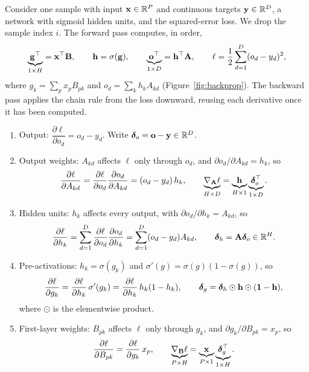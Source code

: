 Consider one sample with input $\mathbf{x}\in\mathbb{R}^P$ and continuous targets $\mathbf{y}\in\mathbb{R}^D$, a network with sigmoid hidden units, and the squared-error loss. We drop the sample index $i$. The forward pass computes, in order,
\begin{equation}
  \underbrace{\mathbf{g}^\top}_{1\times H} = \mathbf{x}^\top\mathbf{B}, \qquad \mathbf{h} = \sigma(\mathbf{g}), \qquad \underbrace{\mathbf{o}^\top}_{1\times D} = \mathbf{h}^\top\mathbf{A}, \qquad \ell = \frac12\sum_{d=1}^D(o_d-y_d)^2,
\end{equation}
where $g_k=\sum_p x_pB_{pk}$ and $o_d=\sum_k h_kA_{kd}$ (Figure~\ref{fig:backprop}). The backward pass applies the chain rule from the loss downward, reusing each derivative once it has been computed.
\begin{enumerate}
  \item Output: $\dfrac{\partial\ell}{\partial o_d} = o_d - y_d$. Write $\boldsymbol{\delta}_{o}=\mathbf{o}-\mathbf{y}\in\mathbb{R}^D$.
  \item Output weights: $A_{kd}$ affects $\ell$ only through $o_d$, and $\partial o_d/\partial A_{kd}=h_k$, so
  \begin{equation}
    \frac{\partial\ell}{\partial A_{kd}} = \frac{\partial\ell}{\partial o_d}\frac{\partial o_d}{\partial A_{kd}} = (o_d-y_d)\,h_k, \qquad \underbrace{\nabla_{\mathbf{A}}\ell}_{H\times D} = \underbrace{\mathbf{h}}_{H\times1}\underbrace{\boldsymbol{\delta}_o^\top}_{1\times D}.
  \end{equation}
  \item Hidden units: $h_k$ affects every output, with $\partial o_d/\partial h_k=A_{kd}$, so
  \begin{equation}
    \frac{\partial\ell}{\partial h_k} = \sum_{d=1}^D\frac{\partial\ell}{\partial o_d}\frac{\partial o_d}{\partial h_k} = \sum_{d=1}^D(o_d-y_d)A_{kd}, \qquad \boldsymbol{\delta}_h = \mathbf{A}\boldsymbol{\delta}_o\in\mathbb{R}^H.
  \end{equation}
  \item Pre-activations: $h_k=\sigma(g_k)$ and $\sigma'(g)=\sigma(g)(1-\sigma(g))$, so
  \begin{equation}
    \frac{\partial\ell}{\partial g_k} = \frac{\partial\ell}{\partial h_k}\,\sigma'(g_k) = \frac{\partial\ell}{\partial h_k}\,h_k(1-h_k), \qquad \boldsymbol{\delta}_g = \boldsymbol{\delta}_h\odot\mathbf{h}\odot(\mathbf{1}-\mathbf{h}),
  \end{equation}
  where $\odot$ is the elementwise product.
  \item First-layer weights: $B_{pk}$ affects $\ell$ only through $g_k$, and $\partial g_k/\partial B_{pk}=x_p$, so
  \begin{equation}
    \frac{\partial\ell}{\partial B_{pk}} = \frac{\partial\ell}{\partial g_k}\,x_p, \qquad \underbrace{\nabla_{\mathbf{B}}\ell}_{P\times H} = \underbrace{\mathbf{x}}_{P\times1}\underbrace{\boldsymbol{\delta}_g^\top}_{1\times H}.
  \end{equation}
\end{enumerate}
